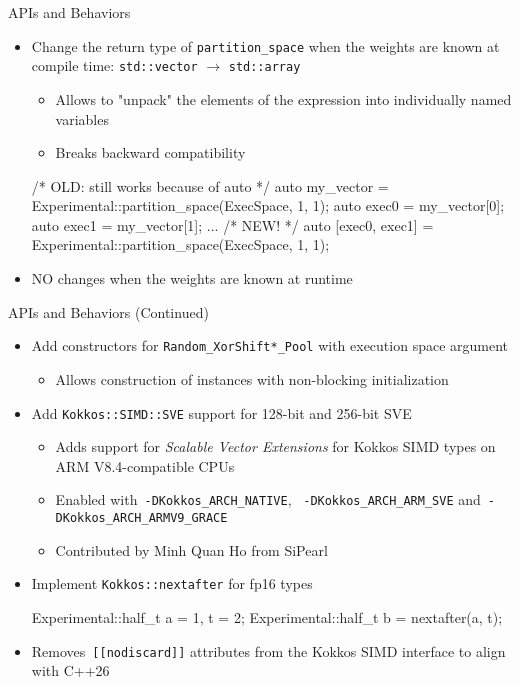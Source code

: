 \begin{frame}[fragile]{APIs and Behaviors}
 \begin{itemize}
   \item Change the return type of \texttt{partition\_space} when the weights are
     known at compile time: \texttt{std::vector} $\rightarrow$
     \texttt{std::array}
    \begin{itemize}
      \item Allows to "unpack" the elements of the expression into individually named variables
      \item Breaks backward compatibility
      \end{itemize}
\begin{code}[keywords={partition_space}]
/* OLD: still works because of auto */
auto my_vector = Experimental::partition_space(ExecSpace, 1, 1);
auto exec0 = my_vector[0];
auto exec1 = my_vector[1];
...
/* NEW! */
auto [exec0, exec1] = Experimental::partition_space(ExecSpace, 1, 1);
\end{code}
   \item NO changes when the weights are known at runtime 
 \end{itemize}
\end{frame}


\begin{frame}[fragile]{APIs and Behaviors (Continued)}
 \begin{itemize}
  \item Add constructors for \texttt{Random\_XorShift*\_Pool} with execution space argument
      \begin{itemize}
      \item Allows construction of instances with non-blocking initialization
    \end{itemize}
     \item Add \texttt{Kokkos::SIMD::SVE} support for 128-bit and 256-bit SVE 
     \begin{itemize}
      \item Adds support for \emph{Scalable Vector Extensions} for Kokkos SIMD types on ARM V8.4-compatible CPUs
      \item Enabled with~\texttt{-DKokkos\_ARCH\_NATIVE}, ~\texttt{-DKokkos\_ARCH\_ARM\_SVE} and~\texttt{-DKokkos\_ARCH\_ARMV9\_GRACE}
      \item Contributed by Minh Quan Ho from SiPearl
     \end{itemize}
     \item Implement \texttt{Kokkos::nextafter} for fp16 types
\begin{code}[keywords={nextafter}]
Experimental::half_t a = 1, t = 2;
Experimental::half_t b = nextafter(a, t);
\end{code}
        \item Removes~\texttt{[[nodiscard]]} attributes from the Kokkos SIMD interface to align with C++26
 \end{itemize}
\end{frame}

